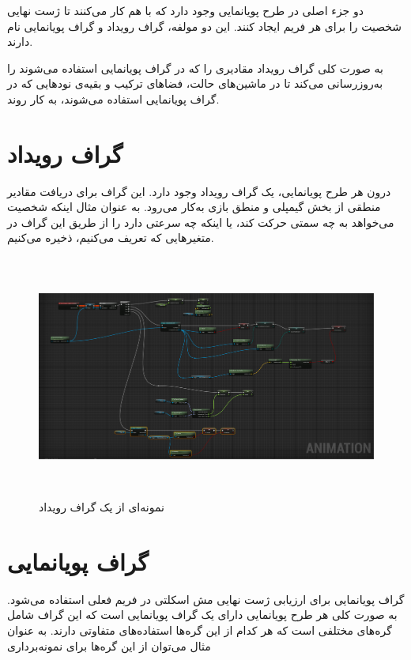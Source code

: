 دو جزء اصلی در طرح پویانمایی وجود دارد که با هم کار می‌کنند تا ژست نهایی شخصیت را برای هر 
فریم ایجاد کنند.
این دو مولفه، گراف رویداد و گراف پویانمایی نام دارند.

به صورت کلی گراف رویداد مقادیری را که در گراف پویانمایی استفاده می‌شوند را به‌روز‌رسانی می‌‌کند تا 
در ماشین‌های حالت، فضاهای ترکیب و بقیه‌ی نود‌هایی که در گراف پویانمایی
 استفاده می‌شوند، به کار روند.

\section{گراف رویداد}

درون هر طرح پویانمایی، یک گراف رویداد وجود دارد. 
این گراف برای دریافت مقادیر منطقی از بخش گیمپلی و منطق بازی به‌کار می‌رود.
به عنوان مثال اینکه شخصیت می‌خواهد به چه سمتی حرکت کند، یا اینکه چه سرعتی دارد را 
از طریق این گراف در متغیرهایی که تعریف می‌کنیم، ذخیره می‌کنیم.
\cite{EventGraphUnrealEngine}

\begin{figure}[ht]
	\centerline{\includegraphics[width=\textwidth,height=8cm,keepaspectratio]{Figures/Ch3/EventGraph.png}}

	\caption{نمونه‌ای از یک گراف رویداد}
	\label{fig:EventGraph}
\end{figure}


\section{گراف پویا‌نمایی}

گراف پویانمایی برای ارزیابی ژست نهایی مش اسکلتی در فریم فعلی استفاده می‌شود.
به صورت کلی هر طرح پویانمایی دارای یک گراف پویانمایی است که 
این گراف شامل گره‌های مختلفی است که هر کدام از این گره‌ها استفاده‌های متفاوتی دارند.
به عنوان مثال می‌توان از این گره‌ها برای نمونه‌برداری


